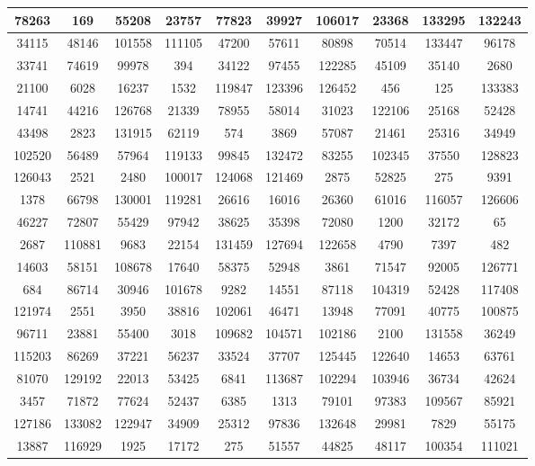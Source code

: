 \documentclass[12pt]{article}
\begin{document}
\begin{appendices}
\begin{table}[H]
\begin{tabular}{|c|c|c|c|c|c|c|c|c|c|}
		78263	& 169	& 55208	& 23757	& 77823	& 39927	& 106017	& 23368	& 133295	& 132243	\\ \hline
		34115	& 48146	& 101558	& 111105	& 47200	& 57611	& 80898	& 70514	& 133447	& 96178	\\ \hline
		33741	& 74619	& 99978	& 394	& 34122	& 97455	& 122285	& 45109	& 35140	& 2680	\\ \hline
		21100	& 6028	& 16237	& 1532	& 119847	& 123396	& 126452	& 456	& 125	& 133383	\\ \hline
		14741	& 44216	& 126768	& 21339	& 78955	& 58014	& 31023	& 122106	& 25168	& 52428	\\ \hline
		43498	& 2823	& 131915	& 62119	& 574	& 3869	& 57087	& 21461	& 25316	& 34949	\\ \hline
		102520	& 56489	& 57964	& 119133	& 99845	& 132472	& 83255	& 102345	& 37550	& 128823	\\ \hline
		126043	& 2521	& 2480	& 100017	& 124068	& 121469	& 2875	& 52825	& 275	& 9391	\\ \hline
		1378	& 66798	& 130001	& 119281	& 26616	& 16016	& 26360	& 61016	& 116057	& 126606	\\ \hline
		46227	& 72807	& 55429	& 97942	& 38625	& 35398	& 72080	& 1200	& 32172	& 65	\\ \hline
		2687	& 110881	& 9683	& 22154	& 131459	& 127694	& 122658	& 4790	& 7397	& 482	\\ \hline
		14603	& 58151	& 108678	& 17640	& 58375	& 52948	& 3861	& 71547	& 92005	& 126771	\\ \hline
		684	& 86714	& 30946	& 101678	& 9282	& 14551	& 87118	& 104319	& 52428	& 117408	\\ \hline
		121974	& 2551	& 3950	& 38816	& 102061	& 46471	& 13948	& 77091	& 40775	& 100875	\\ \hline
		96711	& 23881	& 55400	& 3018	& 109682	& 104571	& 102186	& 2100	& 131558	& 36249	\\ \hline
		115203	& 86269	& 37221	& 56237	& 33524	& 37707	& 125445	& 122640	& 14653	& 63761	\\ \hline
		81070	& 129192	& 22013	& 53425	& 6841	& 113687	& 102294	& 103946	& 36734	& 42624	\\ \hline
		3457	& 71872	& 77624	& 52437	& 6385	& 1313	& 79101	& 97383	& 109567	& 85921	\\ \hline
		127186	& 133082	& 122947	& 34909	& 25312	& 97836	& 132648	& 29981	& 7829	& 55175	\\ \hline
		13887	& 116929	& 1925	& 17172	& 275	& 51557	& 44825	& 48117	& 100354	& 111021	\\ \hline

\end{tabular}
\end{table}
\end{appendices}
\end{document}
